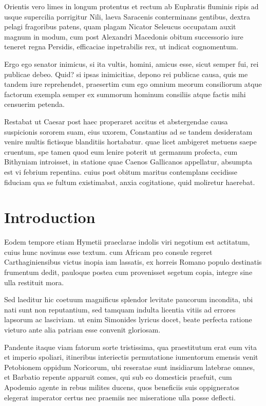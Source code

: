 \documentclass[12pt]{book}
\begin{document}
Orientis vero limes in longum protentus et rectum ab Euphratis fluminis ripis ad usque supercilia porrigitur Nili, laeva Saracenis conterminans gentibus, dextra pelagi fragoribus patens, quam plagam Nicator Seleucus occupatam auxit magnum in modum, cum post Alexandri Macedonis obitum successorio iure teneret regna Persidis, efficaciae inpetrabilis rex, ut indicat cognomentum.

Ergo ego senator inimicus, si ita vultis, homini, amicus esse, sicut semper fui, rei publicae debeo. Quid? si ipsas inimicitias, depono rei publicae causa, quis me tandem iure reprehendet, praesertim cum ego omnium meorum consiliorum atque factorum exempla semper ex summorum hominum consiliis atque factis mihi censuerim petenda.

Restabat ut Caesar post haec properaret accitus et abstergendae causa suspicionis sororem suam, eius uxorem, Constantius ad se tandem desideratam venire multis fictisque blanditiis hortabatur. quae licet ambigeret metuens saepe cruentum, spe tamen quod eum lenire poterit ut germanum profecta, cum Bithyniam introisset, in statione quae Caenos Gallicanos appellatur, absumpta est vi febrium repentina. cuius post obitum maritus contemplans cecidisse fiduciam qua se fultum existimabat, anxia cogitatione, quid moliretur haerebat.


\chapter{Introduction}




Eodem tempore etiam Hymetii praeclarae indolis viri negotium est actitatum, cuius hunc novimus esse textum. cum Africam pro consule regeret Carthaginiensibus victus inopia iam lassatis, ex horreis Romano populo destinatis frumentum dedit, pauloque postea cum provenisset segetum copia, integre sine ulla restituit mora.

Sed laeditur hic coetuum magnificus splendor levitate paucorum incondita, ubi nati sunt non reputantium, sed tamquam indulta licentia vitiis ad errores lapsorum ac lasciviam. ut enim Simonides lyricus docet, beate perfecta ratione vieturo ante alia patriam esse convenit gloriosam.

Pandente itaque viam fatorum sorte tristissima, qua praestitutum erat eum vita et imperio spoliari, itineribus interiectis permutatione iumentorum emensis venit Petobionem oppidum Noricorum, ubi reseratae sunt insidiarum latebrae omnes, et Barbatio repente apparuit comes, qui sub eo domesticis praefuit, cum Apodemio agente in rebus milites ducens, quos beneficiis suis oppigneratos elegerat imperator certus nec praemiis nec miseratione ulla posse deflecti.
\end{document}

